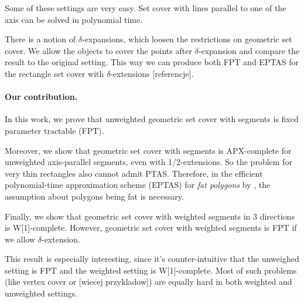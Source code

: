 Some of these settings are very easy.
Set cover with lines parallel to one of the axis
can be solved in polynomial time.

There is a notion of $\delta$-expansions,
which loosen the restrictions on geometric set cover.
We allow the objects to cover the points
after $\delta$-expansion and compare
the result to the original setting.
This way we can produce both FPT and EPTAS
for the rectangle set cover with $\delta$-extensions
[referencje].



\paragraph{Our contribution.}
In this work, we prove that unweighted geometric set cover
with segments is fixed parameter tractable (FPT).

Moreover, we show that geometric set cover with segments
is APX-complete for unweighted axis-parallel segments,
even with 1/2-extensions.
So the problem for very thin rectangles
also cannot admit PTAS.
Therefore, in the efficient polynomial-time approximation scheme (EPTAS)
for \textit{fat polygons} by \cite{harpeled12},
the assumption about polygons being fat is necessary. 

Finally, we show that geometric set cover with weighted segments in
3 directions is W[1]-complete.
However, geometric set cover with weighted segments is FPT if we allow
$\delta$-extension.

This result is especially interesting,
since it's counter-intuitive that
the unweighed setting is FPT and the weighted
setting is W[1]-complete.
Most of such problems (like vertex cover or [wiecej przykladow])
are equally hard in both weighted and unweighted settings.
